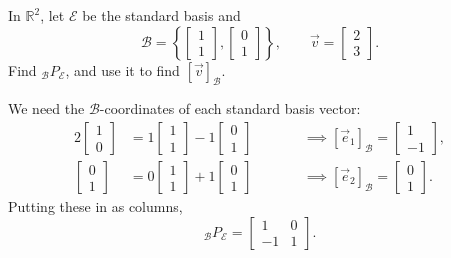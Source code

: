 \begin{example}
In $\mathbb{R}^2$, let $\mathcal{E}$ be the standard basis and
\[
\mathcal{B} = \left\{ \begin{bmatrix} 1 \\ 1 \end{bmatrix}, \begin{bmatrix} 0 \\ 1 \end{bmatrix} \right\},
\qquad
\vec{v} = \begin{bmatrix} 2 \\ 3 \end{bmatrix}.
\]
Find ${}_{\mathcal{B}}P_{\mathcal{E}}$, and use it to find $[\vec{v}]_{\mathcal{B}}$.

\begin{solution}
We need the $\mathcal{B}$-coordinates of each standard basis vector:
\begin{alignat*}{2}
\begin{bmatrix} 1 \\ 0 \end{bmatrix} &= 1\begin{bmatrix} 1 \\ 1 \end{bmatrix} - 1\begin{bmatrix} 0 \\ 1 \end{bmatrix}
&\qquad& \implies [\vec{e}_1]_{\mathcal{B}} = \begin{bmatrix} 1 \\ -1 \end{bmatrix}, \\
\begin{bmatrix} 0 \\ 1 \end{bmatrix} &= 0\begin{bmatrix} 1 \\ 1 \end{bmatrix} + 1\begin{bmatrix} 0 \\ 1 \end{bmatrix}
&& \implies [\vec{e}_2]_{\mathcal{B}} = \begin{bmatrix} 0 \\ 1 \end{bmatrix}.
\end{alignat*}
Putting these in as columns,
\[
{}_{\mathcal{B}}P_{\mathcal{E}} = \begin{bmatrix} 1 & 0 \\ -1 & 1 \end{bmatrix}.
\]
\end{solution}
\end{example}
